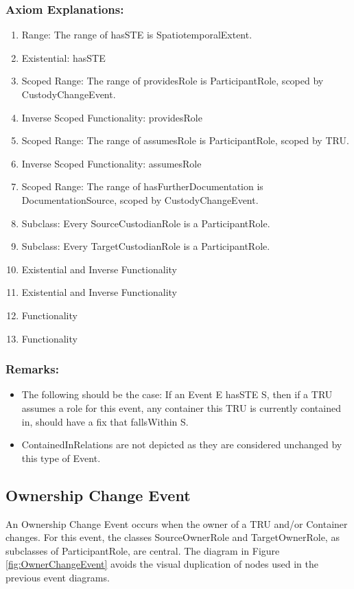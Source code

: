 \subsubsection*{Axiom Explanations:}
\begin{enumerate}
    \item Range: The range of \textsf{hasSTE} is \textsf{SpatiotemporalExtent}.
    \item Existential: \textsf{hasSTE}
    \item Scoped Range: The range of \textsf{providesRole} is \textsf{ParticipantRole}, scoped by \textsf{CustodyChangeEvent}.
    \item Inverse Scoped Functionality: \textsf{providesRole}
    \item Scoped Range: The range of \textsf{assumesRole} is \textsf{ParticipantRole}, scoped by \textsf{TRU}.
    \item Inverse Scoped Functionality: \textsf{assumesRole}
    \item Scoped Range: The range of \textsf{hasFurtherDocumentation} is \textsf{DocumentationSource}, scoped by \textsf{CustodyChangeEvent}.
    \item Subclass: Every \textsf{SourceCustodianRole} is a \textsf{ParticipantRole}.
    \item Subclass: Every \textsf{TargetCustodianRole} is a \textsf{ParticipantRole}.
    \item Existential and Inverse Functionality
    \item Existential and Inverse Functionality
    \item Functionality
    \item Functionality
\end{enumerate}

\subsubsection{Remarks:}
\begin{itemize}
    \item The following should be the case: If an Event E hasSTE S, then if a TRU assumes a role for this event, any container this TRU is currently contained in, should have a fix that fallsWithin S.
    \item ContainedInRelations are not depicted as they are considered unchanged by this type of Event.
\end{itemize}

\subsection{Ownership Change Event}
\label{ssec:owner}
An Ownership Change Event occurs when the owner of a TRU and/or Container changes. For this event, the classes SourceOwnerRole and TargetOwnerRole, as subclasses of ParticipantRole, are central. The diagram in Figure \ref{fig:OwnerChangeEvent} avoids the visual duplication of nodes used in the previous event diagrams.

